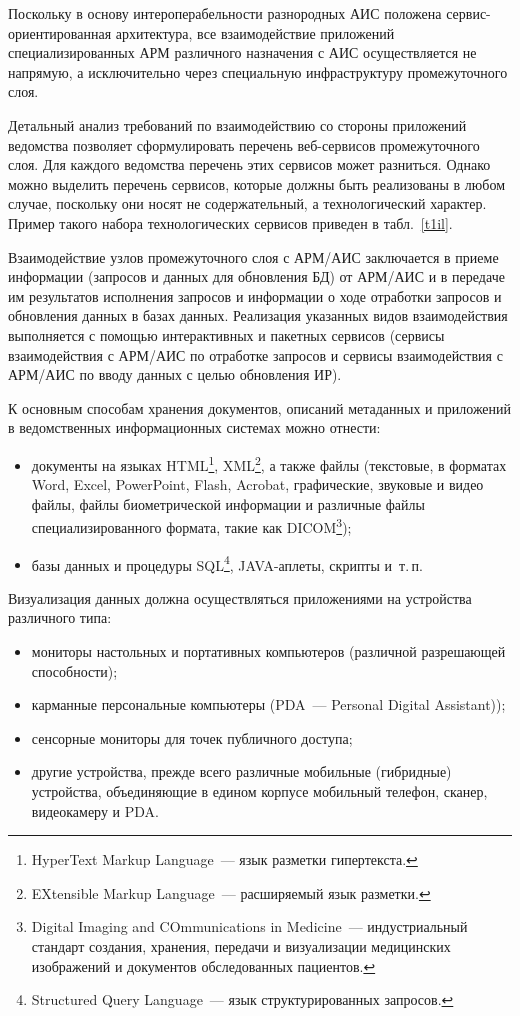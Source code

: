 \begin{multicols}{2}
      Поскольку в основу интероперабельности разнородных АИС положена 
      сервис-ориентированная архитектура, все взаимодействие приложений 
специализированных АРМ различного назначения с АИС осуществляется не напрямую, а 
исключительно через специальную инфраструктуру промежуточного слоя.
      
      Детальный анализ требований по взаимодействию со стороны приложений ведомства 
позволяет сформулировать перечень веб-сер\-ви\-сов промежуточного слоя. Для каждого 
ведомства перечень этих сервисов может разниться. Однако можно выделить перечень 
сервисов, которые должны быть реализованы в любом случае, поскольку они носят не 
содержательный, а технологический характер. Пример такого набора технологических 
сервисов приведен в табл.~\ref{t1il}. 
       
       

      
      Взаимодействие узлов промежуточного слоя с АРМ/АИС заключается в приеме 
информации (запросов и данных для обновления БД) от АРМ/АИС и в передаче им 
результатов исполнения запросов и информации о ходе отработки запросов и об\-нов\-ле\-ния 
данных в базах данных. Реализация указанных видов взаимодействия выполняется с помощью 
интерактивных и пакетных сервисов (сервисы взаимодействия с АРМ/АИС по отработке 
запросов и сервисы взаимодействия с АРМ/АИС по вводу данных с \mbox{целью} обновления ИР). 
      
      К основным способам хранения документов, описаний метаданных и приложений в 
ведомственных информационных системах можно отнести:
      \begin{itemize}
\item документы на языках HTML\footnote{HyperText Markup Language~--- язык разметки гипертекста.},
XML\footnote{EXtensible Markup Language~--- расширяемый
язык разметки.}, а также файлы (текстовые, в форматах Word, 
Excel, PowerPoint, Flash, Acrobat, графические, звуковые и видео файлы, файлы 
биометрической информации и различные файлы специализированного формата, такие 
как DICOM\footnote{Digital Imaging and COmmunications in Medicine~--- индустриальный стандарт создания,
хранения, передачи и визуализации медицинских изображений и документов
обследованных пациентов.});
\item базы данных и процедуры SQL\footnote{Structured Query Language~--- язык структурированных
запросов.}, JAVA-аплеты, скрипты и~т.\,п.
\end{itemize}

      Визуализация данных должна осуществляться приложениями на устройства различного 
типа:
      \begin{itemize}
\item мониторы настольных и портативных компьютеров (различной разрешающей 
способности);
\item карманные персональные компьютеры (PDA~--- Personal Digital Assistant));
\item сенсорные мониторы для точек публичного доступа;
\item другие устройства, прежде всего различные мобильные (гибридные) устройства, 
объеди\-ня\-ющие в едином корпусе мобильный телефон, сканер, видеокамеру и PDA.
\end{itemize}
      

\end{multicols}
